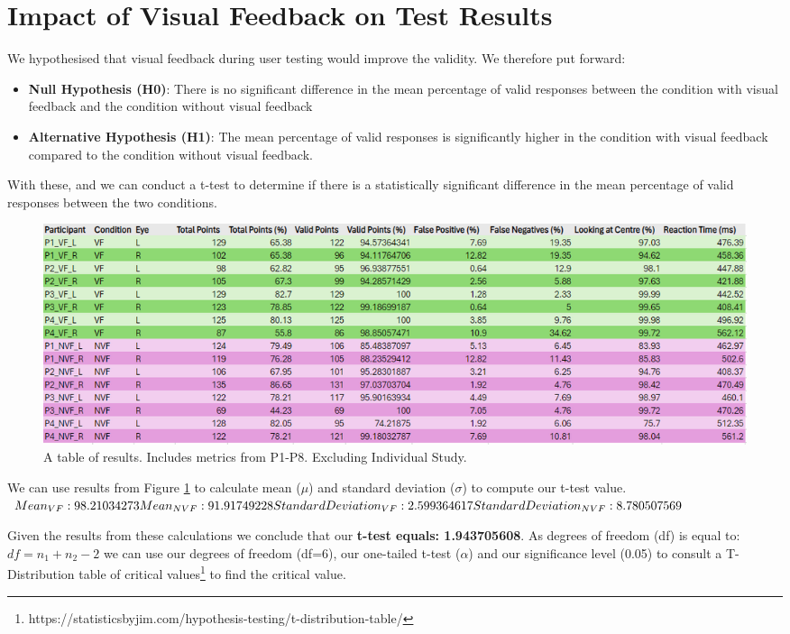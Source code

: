 \documentclass{l4proj}
\begin{document}
\section{Impact of Visual Feedback on Test Results} \label{evaluation:Visual_Feedback}
We hypothesised that visual feedback during user testing would improve the validity. We therefore put forward:
\begin{itemize}
    \item \textbf{Null Hypothesis (H0)}: There is no significant difference in the mean percentage of valid responses between the condition with visual feedback and the condition without visual feedback
    \item \textbf{Alternative Hypothesis (H1)}: The mean percentage of valid responses is significantly higher in the condition with visual feedback compared to the condition without visual feedback.
\end{itemize}
With these, and we can conduct a t-test to determine if there is a statistically significant difference in the mean percentage of valid responses between the two conditions. 
\begin{figure}[htbp]
    \centering
    \includegraphics[width=1\linewidth]{dissertation/images/Results.png}    

    \caption{A table of results. Includes metrics from P1-P8. Excluding Individual Study.}
    \label{fig:results} 
\end{figure}
\newline
We can use results from Figure \ref{fig:results} to calculate mean ($\mu$) and standard deviation ($\sigma$) to compute our t-test value. \newline
\newline
$Mean_{VF}: 98.21034273 \newline 
Mean_{NVF}: 91.91749228 \newline
\newline
Standard Deviation_{VF}: 2.599364617 \newline
Standard Deviation_{NVF}: 8.780507569 
$

Given the results from these calculations we conclude that our \textbf{t-test equals: 1.943705608}. As degrees of freedom (df) is equal to:
$df = n_1 + n_2 -2$
we can use our degrees of freedom (df=6), our one-tailed t-test ($\alpha$) and our significance level (0.05) to consult a T-Distribution table of critical values\footnote{https://statisticsbyjim.com/hypothesis-testing/t-distribution-table/} to find the critical value.
\end{document}

